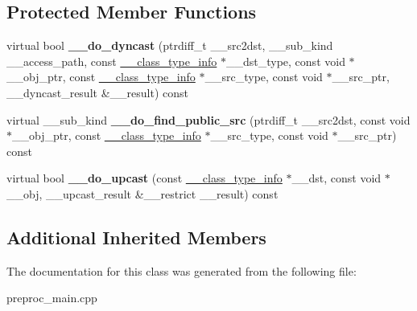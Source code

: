 \subsection*{Protected Member Functions}
\begin{DoxyCompactItemize}
\item 
\hypertarget{class____cxxabiv1_1_1____vmi__class__type__info_a7517d6d13766e9536aee78a2a91e3bb2}{virtual bool {\bfseries \+\_\+\+\_\+do\+\_\+dyncast} (ptrdiff\+\_\+t \+\_\+\+\_\+src2dst, \+\_\+\+\_\+sub\+\_\+kind \+\_\+\+\_\+access\+\_\+path, const \hyperlink{class____cxxabiv1_1_1____class__type__info}{\+\_\+\+\_\+class\+\_\+type\+\_\+info} $\ast$\+\_\+\+\_\+dst\+\_\+type, const void $\ast$\+\_\+\+\_\+obj\+\_\+ptr, const \hyperlink{class____cxxabiv1_1_1____class__type__info}{\+\_\+\+\_\+class\+\_\+type\+\_\+info} $\ast$\+\_\+\+\_\+src\+\_\+type, const void $\ast$\+\_\+\+\_\+src\+\_\+ptr, \+\_\+\+\_\+dyncast\+\_\+result \&\+\_\+\+\_\+result) const }\label{class____cxxabiv1_1_1____vmi__class__type__info_a7517d6d13766e9536aee78a2a91e3bb2}

\item 
\hypertarget{class____cxxabiv1_1_1____vmi__class__type__info_af629af43a567ea309cacae1c542fb77b}{virtual \+\_\+\+\_\+sub\+\_\+kind {\bfseries \+\_\+\+\_\+do\+\_\+find\+\_\+public\+\_\+src} (ptrdiff\+\_\+t \+\_\+\+\_\+src2dst, const void $\ast$\+\_\+\+\_\+obj\+\_\+ptr, const \hyperlink{class____cxxabiv1_1_1____class__type__info}{\+\_\+\+\_\+class\+\_\+type\+\_\+info} $\ast$\+\_\+\+\_\+src\+\_\+type, const void $\ast$\+\_\+\+\_\+src\+\_\+ptr) const }\label{class____cxxabiv1_1_1____vmi__class__type__info_af629af43a567ea309cacae1c542fb77b}

\item 
\hypertarget{class____cxxabiv1_1_1____vmi__class__type__info_a9aa73e9331b2ac8b274fcc7d1420155a}{virtual bool {\bfseries \+\_\+\+\_\+do\+\_\+upcast} (const \hyperlink{class____cxxabiv1_1_1____class__type__info}{\+\_\+\+\_\+class\+\_\+type\+\_\+info} $\ast$\+\_\+\+\_\+dst, const void $\ast$\+\_\+\+\_\+obj, \+\_\+\+\_\+upcast\+\_\+result \&\+\_\+\+\_\+restrict \+\_\+\+\_\+result) const }\label{class____cxxabiv1_1_1____vmi__class__type__info_a9aa73e9331b2ac8b274fcc7d1420155a}

\end{DoxyCompactItemize}
\subsection*{Additional Inherited Members}


The documentation for this class was generated from the following file\+:\begin{DoxyCompactItemize}
\item 
preproc\+\_\+main.\+cpp\end{DoxyCompactItemize}
